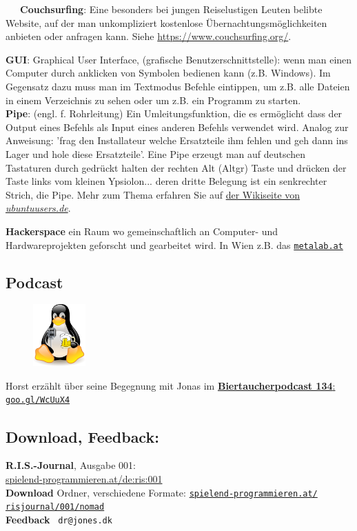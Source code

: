 ~~~\textbf{Couchsurfing}: Eine besonders bei jungen Reiselustigen Leuten belibte Website, auf der man unkompliziert kostenlose Übernachtungsmöglichkeiten anbieten oder anfragen kann. Siehe \url{https://www.couchsurfing.org/}.

\textbf{GUI}: Graphical User Interface, (grafische Benutzerschnittstelle): wenn man einen Computer durch anklicken von Symbolen bedienen kann (z.B. Windows). Im Gegensatz dazu muss man im Textmodus Befehle eintippen, um z.B. alle Dateien in einem Verzeichnis zu sehen oder um z.B. ein Programm zu starten. \\

\textbf{Pipe}: (engl. f. Rohrleitung) Ein Umleitungsfunktion, die es ermöglicht dass der Output eines Befehls als Input eines anderen Befehls verwendet wird. Analog zur Anweisung: 'frag den Installateur welche Ersatzteile ihm fehlen und geh dann ins Lager und hole diese Ersatzteile'. Eine Pipe erzeugt man auf deutschen Tastaturen durch gedrückt halten der rechten Alt (Altgr) Taste und drücken der Taste links vom kleinen Ypsiolon... deren dritte Belegung ist ein senkrechter Strich, die Pipe. Mehr zum Thema erfahren Sie auf \href{http://wiki.ubuntuusers.de/Shell/Umleitungen}{der Wikiseite von \textit{ubuntuusers.de}}.

\textbf{Hackerspace} ein Raum wo gemeinschaftlich an Computer- und Hardwareprojekten geforscht und gearbeitet wird. In Wien z.B. das \href{http://metalab.at}{\texttt{metalab.at}} 

\subsection*{Podcast}
\begin{figure}
\includegraphics[width=2cm]{nomad/biertaucherlogo.png}
\end{figure}
Horst erzählt über seine Begegnung mit Jonas im  \href{http://spielend-programmieren.at/de:podcast:biertaucher:2013:134}{\textbf{Biertaucherpodcast 134}: \texttt{goo.gl/WcUuX4}}

\subsection*{Download, Feedback:}
\textbf{R.I.S.-Journal}, Ausgabe 001: \\
\href{http://spielend-programmieren.at/de:ris:001}{spielend-programmieren.at/de:ris:001}\\
\textbf{Download} Ordner, verschiedene Formate: \href{http://spielend-programmieren.at/risjournal/001/nomad}{\texttt{spielend-programmieren.at/\\risjournal/001/nomad}} \\
\textbf{Feedback} \Letter\ \texttt{dr@jones.dk} \\

